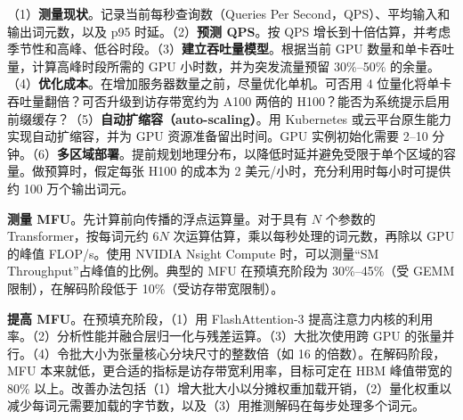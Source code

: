 \begin{interview}
（1）\textbf{测量现状}。记录当前每秒查询数（Queries Per Second，QPS）、平均输入和输出词元数，以及 p95 时延。（2）\textbf{预测 QPS}。按 QPS 增长到十倍估算，并考虑季节性和高峰、低谷时段。（3）\textbf{建立吞吐量模型}。根据当前 GPU 数量和单卡吞吐量，计算高峰时段所需的 GPU 小时数，并为突发流量预留 30\%–50\% 的余量。（4）\textbf{优化成本}。在增加服务器数量之前，尽量优化单机。可否用 4 位量化将单卡吞吐量翻倍？可否升级到访存带宽约为 A100 两倍的 H100？能否为系统提示启用前缀缓存？（5）\textbf{自动扩缩容（auto-scaling）}。用 Kubernetes 或云平台原生能力实现自动扩缩容，并为 GPU 资源准备留出时间。GPU 实例初始化需要 2–10 分钟。（6）\textbf{多区域部署}。提前规划地理分布，以降低时延并避免受限于单个区域的容量。做预算时，假定每张 H100 的成本为 2 美元/小时，充分利用时每小时可提供约 100 万个输出词元。

\textbf{测量 MFU}。先计算前向传播的浮点运算量。对于具有 $N$ 个参数的 Transformer，按每词元约 $6N$ 次运算估算，乘以每秒处理的词元数，再除以 GPU 的峰值 FLOP/s。使用 NVIDIA Nsight Compute 时，可以测量“SM Throughput”占峰值的比例。典型的 MFU 在预填充阶段为 30\%–45\%（受 GEMM 限制），在解码阶段低于 10\%（受访存带宽限制）。

\textbf{提高 MFU}。在预填充阶段，（1）用 FlashAttention-3 提高注意力内核的利用率。（2）分析性能并融合层归一化与残差运算。（3）大批次使用跨 GPU 的张量并行。（4）令批大小为张量核心分块尺寸的整数倍（如 16 的倍数）。在解码阶段，MFU 本来就低，更合适的指标是访存带宽利用率，目标可定在 HBM 峰值带宽的 80\% 以上。改善办法包括（1）增大批大小以分摊权重加载开销，（2）量化权重以减少每词元需要加载的字节数，以及（3）用推测解码在每步处理多个词元。

\end{interview}
